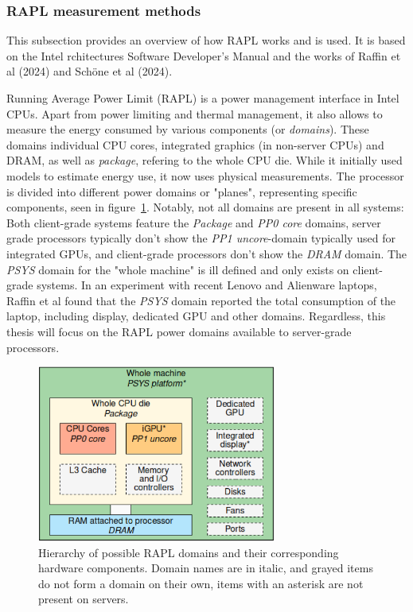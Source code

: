 \subsubsection{RAPL measurement methods}
\label{sec:raplmethodology}
This subsection provides an overview of how RAPL works and is used. It is based on the Intel rchitectures Software Developer’s Manual\parencite[Section 16.10]{intel-sdm} and the works of Raffin et al \parencite{raffin2024dissecting} (2024) and Schöne et al \parencite{schone2024energy} (2024).

Running Average Power Limit (RAPL) is a power management interface in Intel CPUs. Apart from power limiting and thermal management, it also allows to measure the energy consumed by various components (or \textit{domains}). These domains individual CPU cores, integrated graphics (in non-server CPUs) and DRAM, as well as \textit{package}, refering to the whole CPU die. While it initially used models to estimate energy use\parencite{hackenberg2015energy}, it now uses physical measurements. The processor is divided into different power domains or "planes", representing specific components, seen in figure~\ref{fig:rapl_domains}. Notably, not all domains are present in all systems: Both client-grade systems feature the \textit{Package} and \textit{PP0 core} domains, server grade processors typically don't show the \textit{PP1 uncore}-domain typically used for integrated GPUs, and client-grade processors don't show the \textit{DRAM} domain. The \textit{PSYS} domain for the "whole machine" is ill defined and only exists on client-grade systems. In an experiment with recent Lenovo and Alienware laptops, Raffin et al found that the \textit{PSYS} domain reported the total consumption of the laptop, including display, dedicated GPU and other domains. Regardless, this thesis will focus on the RAPL power domains available to server-grade processors.

\begin{figure}[ht]
    \centering
    \includegraphics[width=0.7\textwidth]{Figures/rapl_domains.png}
    \caption[Rapl domains]{Hierarchy of possible RAPL domains and their corresponding hardware components. Domain names are in italic, and grayed items do not form a domain on their own, items with an asterisk are not present on servers\parencite{raffin2024dissecting}.}
    \label{fig:rapl_domains}
\end{figure}

